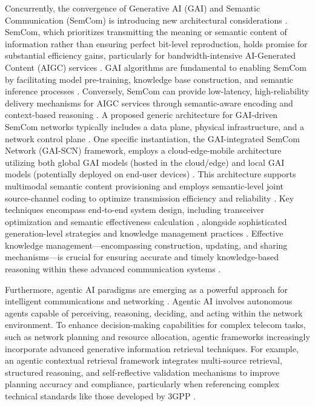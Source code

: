 \documentclass[sigconf]{acmart}
\begin{document}
Concurrently, the convergence of Generative AI (GAI) and Semantic Communication (SemCom) is introducing new architectural considerations \cite{ref22, ref23, ref24}. SemCom, which prioritizes transmitting the meaning or semantic content of information rather than ensuring perfect bit-level reproduction, holds promise for substantial efficiency gains, particularly for bandwidth-intensive AI-Generated Content (AIGC) services \cite{ref22, ref24}. GAI algorithms are fundamental to enabling SemCom by facilitating model pre-training, knowledge base construction, and semantic inference processes \cite{ref22, ref23, ref24}. Conversely, SemCom can provide low-latency, high-reliability delivery mechanisms for AIGC services through semantic-aware encoding and context-based reasoning \cite{ref22, ref23, ref24}. A proposed generic architecture for GAI-driven SemCom networks typically includes a data plane, physical infrastructure, and a network control plane \cite{ref22, ref24}. One specific instantiation, the GAI-integrated SemCom Network (GAI-SCN) framework, employs a cloud-edge-mobile architecture utilizing both global GAI models (hosted in the cloud/edge) and local GAI models (potentially deployed on end-user devices) \cite{ref23}. This architecture supports multimodal semantic content provisioning and employs semantic-level joint source-channel coding to optimize transmission efficiency and reliability \cite{ref23}. Key techniques encompass end-to-end system design, including transceiver optimization and semantic effectiveness calculation \cite{ref22, ref24}, alongside sophisticated generation-level strategies and knowledge management practices \cite{ref22, ref24}. Effective knowledge management—encompassing construction, updating, and sharing mechanisms—is crucial for ensuring accurate and timely knowledge-based reasoning within these advanced communication systems \cite{ref24}.

Furthermore, agentic AI paradigms are emerging as a powerful approach for intelligent communications and networking \cite{ref35}. Agentic AI involves autonomous agents capable of perceiving, reasoning, deciding, and acting within the network environment. To enhance decision-making capabilities for complex telecom tasks, such as network planning and resource allocation, agentic frameworks increasingly incorporate advanced generative information retrieval techniques. For example, an agentic contextual retrieval framework integrates multi-source retrieval, structured reasoning, and self-reflective validation mechanisms to improve planning accuracy and compliance, particularly when referencing complex technical standards like those developed by 3GPP \cite{ref35}.
\end{document}
